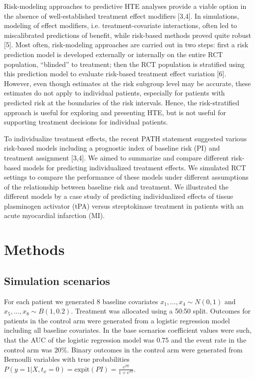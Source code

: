 \documentclass{article}
\begin{document}
Risk-modeling approaches to predictive HTE analyses provide a viable
option in the absence of well-established treatment effect modifiers
{[}3,4{]}. In simulations, modeling of effect modifiers, i.e.
treatment-covariate interactions, often led to miscalibrated predictions
of benefit, while risk-based methods proved quite robust {[}5{]}. Most
often, risk-modeling approaches are carried out in two steps: first a
risk prediction model is developed externally or internally on the
entire RCT population, ``blinded'' to treatment; then the RCT population
is stratified using this prediction model to evaluate risk-based
treatment effect variation {[}6{]}. However, even though estimates at
the risk subgroup level may be accurate, these estimates do not apply to
individual patients, especially for patients with predicted risk at the
boundaries of the risk intervals. Hence, the risk-stratified approach is
useful for exploring and presenting HTE, but is not useful for
supporting treatment decisions for individual patients.

To individualize treatment effects, the recent PATH statement suggested
various risk-based models including a prognostic index of baseline risk
(PI) and treatment assignment {[}3,4{]}. We aimed to summarize and
compare different risk-based models for predicting individualized
treatment effects. We simulated RCT settings to compare the performance
of these models under different assumptions of the relationship between
baseline risk and treatment. We illustrated the different models by a
case study of predicting individualized effects of tissue plasminogen
activator (tPA) versus streptokinase treatment in patients with an acute
myocardial infarction (MI).

\hypertarget{methods}{%
\section{Methods}\label{methods}}

\hypertarget{simulation-scenarios}{%
\subsection{Simulation scenarios}\label{simulation-scenarios}}

For each patient we generated 8 baseline covariates
\(x_1,\dots,x_4\sim N(0, 1)\) and \(x_5,\dots,x_8\sim B(1, 0.2)\).
Treatment was allocated using a 50:50 split. Outcomes for patients in
the control arm were generated from a logistic regression model
including all baseline covariates. In the base scenarios coefficient
values were such, that the AUC of the logistic regression model was
\(0.75\) and the event rate in the control arm was \(20\%\). Binary
outcomes in the control arm were generated from Bernoulli variables with
true probabilities
\(P(y=1|X, t_x = 0) = \text{expit}(PI)=\frac{e^{PI}}{1+e^{PI}}\).
\end{document}
